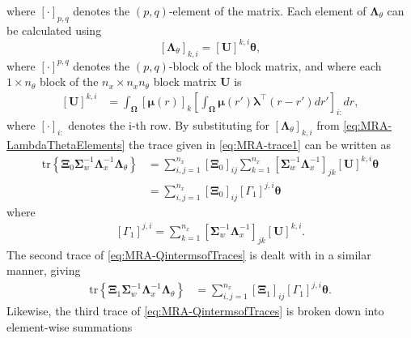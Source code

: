 \documentclass[11pt,draftcls,onecolumn,peerreview]{IEEEtran}
\begin{document}
where $[\cdot]_{p,q}$ denotes the $\left(p,q\right)$-element of the matrix. Each element of $\boldsymbol\Lambda_{\theta}$ can be calculated using
\begin{equation}\label{eq:MRA-LambdaThetaElements}
\left[ \boldsymbol\Lambda_{\theta}\right] _{k,i}=\left[ \mathbf U\right]^{k,i}\boldsymbol\theta,
\end{equation}
where $ [\cdot]^{p,q}$ denotes the $\left(p,q\right)$-block of the block matrix, and where
each $ 1 \times n_{\theta}$ block of the $n_x \times n_x n_{\theta}$ block matrix $\mathbf U$ is 
\begin{align}
\left[ \mathbf U\right] ^{k,i}&=\int_{\boldsymbol \Omega}\left[\boldsymbol\mu(r) \right]_k \left[\int_{\boldsymbol\Omega} \boldsymbol\mu\left(r'\right)\boldsymbol \lambda^\top \left(r-r'\right) dr'\right]_{i:} dr,
\end{align}
where $[\cdot]_{i:} $ denotes the i-th row.  By substituting for $\left[ \boldsymbol\Lambda_{\theta}\right] _{k,i}$ from \eqref{eq:MRA-LambdaThetaElements} the trace given in \eqref{eq:MRA-trace1} can be written as
\begin{align}
\mathrm{tr} \left\lbrace \boldsymbol \Xi_0\boldsymbol\Sigma_w^{-1}\boldsymbol\Lambda_x^{-1}\boldsymbol\Lambda_{\theta}\right\rbrace&=\sum_{i,j=1}^{n_x}\left[ \boldsymbol\Xi_0\right]_{ij}\sum_{k=1}^{n_x}\left[ \boldsymbol\Sigma_w^{-1}\boldsymbol\Lambda_x^{-1}\right]_{jk} \left[ \mathbf U\right]^{k,i}\boldsymbol\theta \nonumber \\
&=\sum_{i,j=1}^{n_x}\left[ \boldsymbol\Xi_0\right]_{ij}\left[ \Gamma_1\right] ^{j,i}\boldsymbol\theta
\end{align}
where
\begin{align}
\left[ \Gamma_1\right]^{j,i} =\sum_{k=1}^{n_x}\left[ \boldsymbol\Sigma_w^{-1}\boldsymbol\Lambda_x^{-1}\right]_{jk} \left[ \mathbf U\right]^{k,i}.
\end{align}
The second trace of \eqref{eq:MRA-QintermsofTraces} is dealt with in a similar manner, giving
\begin{align}
\mathrm{tr} \left\lbrace \boldsymbol \Xi_1\boldsymbol\Sigma_w^{-1}\boldsymbol\Lambda_x^{-1}\boldsymbol\Lambda_{\theta}\right\rbrace&=
\sum_{i,j=1}^{n_x}\left[ \boldsymbol\Xi_1\right]_{ij}\left[ \Gamma_1\right] ^{j,i}\boldsymbol\theta.
\end{align}
Likewise, the third trace of \eqref{eq:MRA-QintermsofTraces} is broken down into element-wise summations
\end{document}

